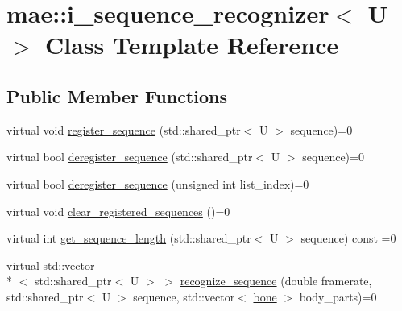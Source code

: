 \hypertarget{classmae_1_1i__sequence__recognizer}{\section{mae\-:\-:i\-\_\-sequence\-\_\-recognizer$<$ U $>$ Class Template Reference}
\label{classmae_1_1i__sequence__recognizer}
}
\subsection*{Public Member Functions}
\begin{DoxyCompactItemize}
\item 
virtual void \hyperlink{classmae_1_1i__sequence__recognizer_ac3e87eabdeec0e8cd9d083d1cb67274f}{register\-\_\-sequence} (std\-::shared\-\_\-ptr$<$ U $>$ sequence)=0
\item 
virtual bool \hyperlink{classmae_1_1i__sequence__recognizer_a23681e6e91a56a02db5942869e3bb57b}{deregister\-\_\-sequence} (std\-::shared\-\_\-ptr$<$ U $>$ sequence)=0
\item 
virtual bool \hyperlink{classmae_1_1i__sequence__recognizer_a3c809ed240ff511a881efe38a6f174d8}{deregister\-\_\-sequence} (unsigned int list\-\_\-index)=0
\item 
virtual void \hyperlink{classmae_1_1i__sequence__recognizer_a19a8b974b8920c64508ae13d91662366}{clear\-\_\-registered\-\_\-sequences} ()=0
\item 
virtual int \hyperlink{classmae_1_1i__sequence__recognizer_a5d3e370dc45d9914dcb07b33f730336e}{get\-\_\-sequence\-\_\-length} (std\-::shared\-\_\-ptr$<$ U $>$ sequence) const =0
\item 
virtual std\-::vector\\*
$<$ std\-::shared\-\_\-ptr$<$ U $>$ $>$ \hyperlink{classmae_1_1i__sequence__recognizer_a8013670ca210f801bc8940bb2a541f21}{recognize\-\_\-sequence} (double framerate, std\-::shared\-\_\-ptr$<$ U $>$ sequence, std\-::vector$<$ \hyperlink{classmae_1_1bone}{bone} $>$ body\-\_\-parts)=0
\end{DoxyCompactItemize}


